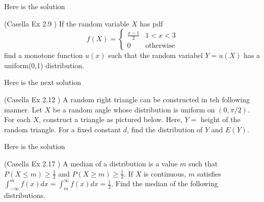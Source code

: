 \documentclass[12pt,letterpaper]{exam}
\begin{document}
\begin{questions}
	
	\begin{solution}
		Here is the solution
	\end{solution}
	
	\setcounter{question}{8}
	\question  (Casella Ex 2.9 ) If the random variable $X$ has pdf $$f(X) = \begin{cases}\frac{x-1}{2} & 1<x<3 \\ 0 & \text{otherwise} \end{cases}$$
	find a monotone function $u(x)$ such that the random variabel $Y = u(X)$ has a uniform(0,1) distribution.
	\begin{solution}
		Here is the next solution
	\end{solution}

	\setcounter{question}{11}
	\question (Casella Ex 2.12 ) A random right triangle can be constructed in teh following manner. Let $X$ be a random angle whose distribution is uniform on $(0, \pi / 2)$. For each $X$, construct a triangle as pictured below. Here, $Y =$ height of the random triangle. For a fixed constant $d$, find the distribution of $Y$ and $E(Y)$. 
	\begin{center}
	\end{center}
	
	\begin{solution}
		Here is the solution
	\end{solution}
	
	\setcounter{question}{16}
	\question  (Casella Ex 2.17 ) A median of a distribution is a value $m$ such that $P(X \le m) \ge \frac{1}{2}$ and $P(X \ge m) \ge \frac{1}{2}$.
	If $X$ is continuous, $m$ satisfies $\int_{-\infty}^{m} f(x) dx = \int_{m}^{\infty} f(x) dx = \frac{1}{2}$. Find the median of the following distributions.
\end{questions}
\end{document}
